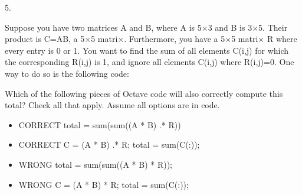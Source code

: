 
5. 

Suppose you have two matrices A and B, where A is 5$ \times $3 and B is 3$ \times $5. Their product is C=AB, a 5$ \times $5 matri$ \times $. Furthermore, you have a 5$ \times $5 matri$ \times $ R where every entry is 0 or 1. You want to find the sum of all elements C(i,j) for which the corresponding R(i,j) is 1, and ignore all elements C(i,j) where R(i,j)=0. One way to do so is the following code:


Which of the following pieces of Octave code will also correctly compute this total? Check all that apply. Assume all options are in code.

\begin{itemize}

\item CORRECT total = sum(sum((A * B) .* R))

\item CORRECT C = (A * B) .* R; total = sum(C(:));

\item WRONG total = sum(sum((A * B) * R));

\item WRONG C = (A * B) * R; total = sum(C(:));
\end{itemize}

